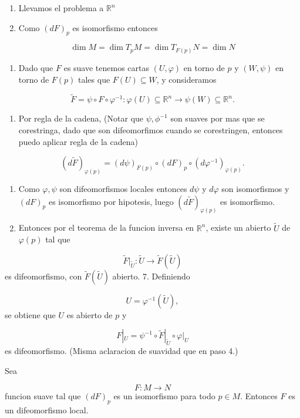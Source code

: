 \begin{bookproof}{}
\begin{enumerate}
\item Llevamos el problema a $\mathbb{R}^{n}$
\item Como $(dF)_{p}$ es isomorfismo entonces
\end{enumerate}
\[
\dim M=\dim T_{p}M=\dim T_{F(p)}N=\dim N
\]
\begin{enumerate}[start=3]
\item Dado que $F$ es suave tenemos cartas $(U,\varphi)$ en torno de $p$ y $(W,\psi)$ en torno de $F(p)$ tales que $F(U) \subseteq W$, y consideramos
\end{enumerate}
\[
\widetilde F = \psi \circ F \circ \varphi^{-1}:\varphi(U) \subseteq \mathbb R^n \to \psi(W) \subseteq \mathbb R^n.
\]
\begin{enumerate}[start=4]
\item Por regla de la cadena, (Notar que $\psi,\phi ^{-1}$ son suaves por mas que se corestringa, dado que son difeomorfimos cuando se corestringen, entonces puedo aplicar regla de la cadena)
\end{enumerate}
\[
(d\widetilde F)_{\varphi(p)}=(d\psi)_{F(p)} \circ (dF)_p \circ (d\varphi^{-1})_{\varphi(p)}.
\]
\begin{enumerate}[start=5]
\item Como $\varphi,\psi$ son difeomorfismos locales entonces $d\psi$ y $d\varphi$ son isomorfismos y $(dF)_p$ es isomorfismo por hipotesis, luego $(d\widetilde F)_{\varphi(p)}$ es isomorfismo.
\item Entonces por el teorema de la funcion inversa en $\mathbb R^n$, existe un abierto $\widetilde U$ de $\varphi(p)$ tal que
\end{enumerate}
\[
\widetilde F|_{\widetilde U}:\widetilde U \to \widetilde F(\widetilde U)
\]
es difeomorfismo, con $\widetilde F(\widetilde U)$ abierto. 7. Definiendo

\[
U=\varphi^{-1}(\widetilde U),
\]
se obtiene que $U$ es abierto de $p$ y

\[
F|_U=\psi^{-1} \circ \widetilde F|_{\widetilde U} \circ \varphi|_U
\]
es difeomorfismo. (Misma aclaracion de suavidad que en paso 4.)

\bookqed
\end{bookproof}
\label{blk:b664ba}
\begin{bookcorollary}{}
Sea

\[
F:M \to N
\]
funcion suave tal que $(dF)_p$ es un isomorfismo para todo $p \in M$. Entonces $F$ es un difeomorfismo local.

\end{bookcorollary}
